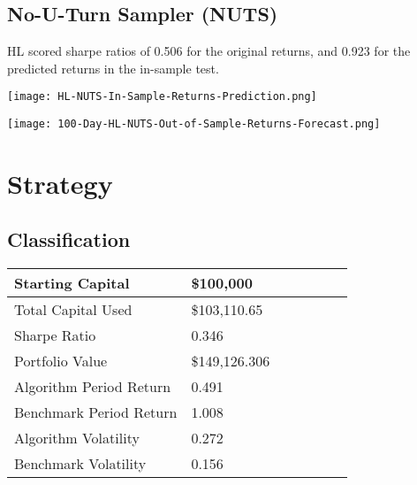 \subsection{No-U-Turn Sampler (NUTS)}

HL scored sharpe ratios of 0.506 for the original returns, and 0.923 for the predicted returns in the in-sample test.

\begin{center}
    \texttt{[image: HL-NUTS-In-Sample-Returns-Prediction.png]}
    \label{fig:nonfloat}
\end{center}

\begin{center}  
    \texttt{[image: 100-Day-HL-NUTS-Out-of-Sample-Returns-Forecast.png]}
    \label{fig:nonfloat}
\end{center}

\section{Strategy}

\subsection{Classification}

\begin{center}
    \begin{tabular}{ | l | l | l | | l | l | l | p{5cm} |}
    \hline
    
    Starting Capital & \$100,000 \\ \hline
    Total Capital Used & \$103,110.65 \\ \hline
    Sharpe Ratio & 0.346 \\ \hline
    Portfolio Value & \$149,126.306 \\ \hline
    Algorithm Period Return & 0.491 \\ \hline
    Benchmark Period Return & 1.008 \\ \hline
    Algorithm Volatility & 0.272 \\ \hline
    Benchmark Volatility & 0.156 \\
    \hline
    \end{tabular}
    \label{table:nonfloat}
\end{center}

